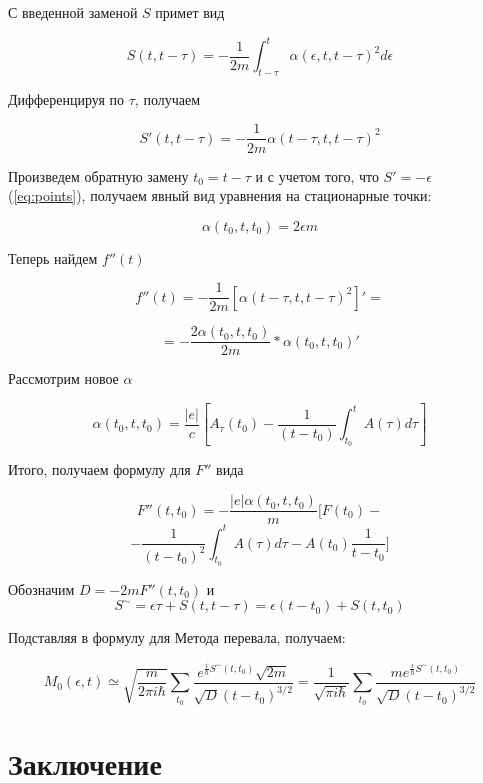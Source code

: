 \documentclass[14pt]{extarticle}
\begin{document}
С введенной заменой $S$ примет вид

$$
S(t, t-\tau) = -\frac{1}{2m}\int_{t-\tau}^{t} \alpha(\epsilon, t, t-\tau)^2 d\epsilon
$$

Дифференцируя по $\tau$, получаем

$$
S'(t, t-\tau) = -\frac{1}{2m} \alpha(t-\tau, t, t-\tau)^2
$$

Произведем обратную замену $t_0 = t-\tau$ и с учетом того, что $S' = -\epsilon$ (\ref{eq:points}), получаем явный вид уравнения на стационарные точки:

$$
\alpha(t_0, t, t_0) = 2 \epsilon m
$$

Теперь найдем $f''(t)$

$$
f''(t) = -\frac{1}{2m}[\alpha(t-\tau, t, t-\tau)^2]' =
$$

$$
= -\frac{2\alpha(t_0, t, t_0)}{2m} * \alpha(t_0, t, t_0)'
$$

Рассмотрим новое $\alpha$

$$
\alpha(t_0, t, t_0) = \frac{|e|}{c} [A_{\tau}(t_0) - \frac{1}{(t-t_0)}\int_{t_0}^{t}A(\tau) d\tau]
$$






Итого, получаем формулу для $F''$ вида

$$
F''(t, t_0) = -\frac{|e|\alpha(t_0, t, t_0)}{m} [F(t_0) - 
$$
$$
-\frac{1}{(t - t_0)^2} \int_{t_0}^{t}A(\tau)d\tau - A(t_0) \frac{1}{t-t_0}]
$$

Обозначим $D = - 2 m F''(t, t_0)$ и $$S^\sim = \epsilon \tau + S(t, t-\tau) = \epsilon(t-t_0) + S(t, t_0)$$

Подставляя в формулу для Метода перевала, получаем:

$$
M_0(\epsilon, t) \simeq \sqrt{\frac{m}{2\pi i \hbar}}\sum_{t_0}\frac{e^{\frac{i}{\hbar}S^\sim(t, t_0)} \sqrt{2m}}{\sqrt{D} (t-t_0)^{3/2}} = \frac{1}{\sqrt{\pi i \hbar}}\sum_{t_0}\frac{me^{\frac{i}{\hbar}S^\sim(t, t_0)} }{\sqrt{D} (t-t_0)^{3/2}}
$$

\section*{Заключение}
  

 
\newpage
\end{document}
